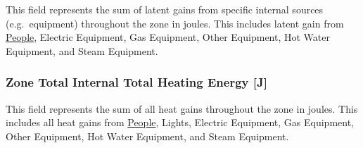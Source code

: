 This field represents the sum of latent gains from specific internal sources (e.g.~equipment) throughout the zone in joules. This includes latent gain from \hyperref[people]{People}, Electric Equipment, Gas Equipment, Other Equipment, Hot Water Equipment, and Steam Equipment.

\subsubsection{Zone Total Internal Total Heating Energy {[}J{]}}\label{zone-total-internal-total-heating-energy-j-1}

This field represents the sum of all heat gains throughout the zone in joules. This includes all heat gains from \hyperref[people]{People}, Lights, Electric Equipment, Gas Equipment, Other Equipment, Hot Water Equipment, and Steam Equipment.
